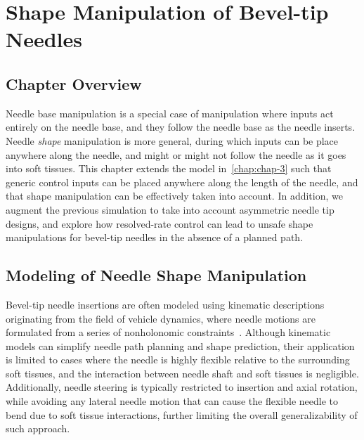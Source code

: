 \chapter{Shape Manipulation of Bevel-tip Needles} \label{chap:chap-4}

\section{Chapter Overview}
\label{sec:chap-4-overview}

Needle base manipulation is a special case of manipulation where inputs act entirely on the needle base, and they follow the needle base as the needle inserts. Needle \textit{shape} manipulation is more general, during which inputs can be place anywhere along the needle, and might or might not follow the needle as it goes into soft tissues. This chapter extends the model in~\cref{chap:chap-3} such that generic control inputs can be placed anywhere along the length of the needle, and that shape manipulation can be effectively taken into account. In addition, we augment the previous simulation to take into account asymmetric needle tip designs, and explore how resolved-rate control can lead to unsafe shape manipulations for bevel-tip needles in the absence of a planned path.

\section{Modeling of Needle Shape Manipulation}
\label{sec:chap-4-model}

Bevel-tip needle insertions are often modeled using kinematic descriptions originating from the field of vehicle dynamics, where needle motions are formulated from a series of nonholonomic constraints~\parencite{parkDiffusionBasedMotionPlanning2005,websterNonholonomicModelingNeedle2006,alterovitzMotionPlanningUncertainty2008}. Although kinematic models can simplify needle path planning and shape prediction, their application is limited to cases where the needle is highly flexible relative to the surrounding soft tissues, and the interaction between needle shaft and soft tissues is negligible. Additionally, needle steering is typically restricted to insertion and axial rotation, while avoiding any lateral needle motion that can cause the flexible needle to bend due to soft tissue interactions, further limiting the overall generalizability of such approach.

